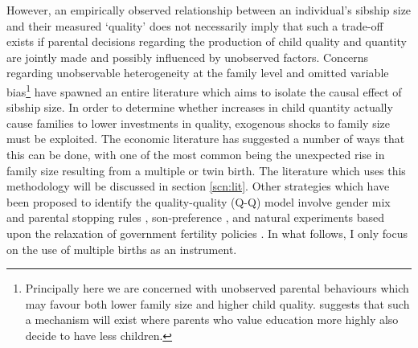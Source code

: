 \documentclass{article}[11pt,subeqn]
\begin{document}
\begin{spacing}{1.5}
However, an empirically observed relationship between an individual's sibship size and their measured `quality' does not necessarily imply that such a trade-off 
exists if parental decisions regarding the production of child quality and quantity are jointly made and possibly influenced by unobserved factors.  Concerns 
regarding unobservable heterogeneity at the family level and omitted variable bias\footnote{Principally here we are concerned with unobserved parental 
behaviours which may favour both lower family size and higher child quality.  \citet{Qian2009} suggests that such a mechanism will exist where parents who 
value education more highly also decide to have less children.} have spawned an entire literature which aims to isolate the causal effect of sibship size.  In 
order to determine whether increases in child quantity actually cause families to lower investments in quality, exogenous shocks to family size must be exploited.  
The economic literature has suggested a number of ways that this can be done, with one of the most common being the unexpected rise in family size resulting 
from a multiple or twin birth.  The literature which uses this methodology will be discussed in section \ref{scn:lit}.  Other strategies which have been 
proposed to identify the quality-quality (Q-Q) model involve gender mix and parental stopping rules \citep{ConleyGlauber2006}, son-preference \citep{Lee2008}, 
and natural experiments based upon the relaxation of government fertility policies \citep{Qian2009}.   In what follows, I only focus on the use of multiple 
births as an instrument.


\end{spacing}
\end{document}
